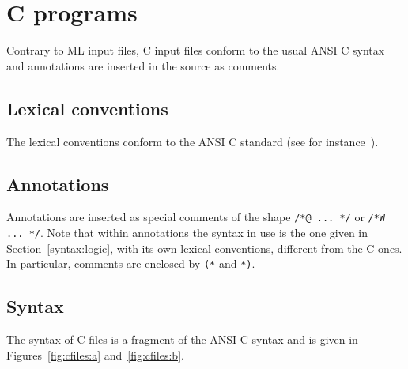 \documentclass[a4paper,12pt]{report}
\begin{document}
\section{C programs}
\label{syntax:C}

Contrary to ML input files, C input files conform to the usual ANSI C
syntax and annotations are inserted in the source as comments.

\subsection{Lexical conventions}
\label{lexical:c}

The lexical conventions conform to the ANSI C standard (see
for instance~\cite{KR88}).

\subsection{Annotations}

Annotations are inserted as special comments of the shape
\texttt{/*@ ... */} or \texttt{/*W ... */}.
Note that within annotations the syntax in use is the one given in
Section~\ref{syntax:logic}, with its own lexical conventions,
different from the C ones. In particular, comments are enclosed by
\texttt{(*} and \texttt{*)}.

\subsection{Syntax}

The syntax of C files is a fragment of the ANSI C syntax
and is given in Figures~\ref{fig:cfiles:a} and~\ref{fig:cfiles:b}.
\end{document}
